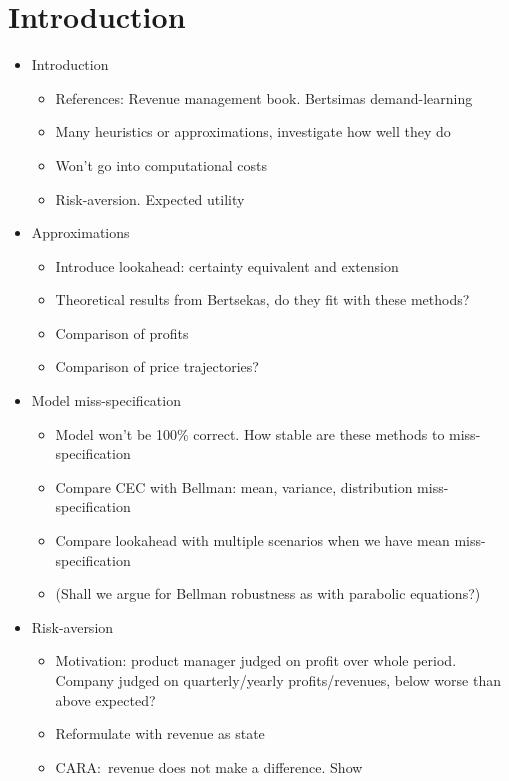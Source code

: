 \documentclass[main.tex]{subfiles}
\begin{document}
\listoftodos

\section{Introduction}

\begin{itemize}
\item Introduction
  \begin{itemize}
  \item References: Revenue management book. Bertsimas demand-learning
  \item Many heuristics or approximations, investigate how well they
    do
  \item Won't go into computational costs
  \item Risk-aversion. Expected utility
  \end{itemize}
\item Approximations
  \begin{itemize}
    \item Introduce lookahead: certainty equivalent and extension
  \item Theoretical results from Bertsekas, do they fit with these methods?
  \item Comparison of profits
  \item Comparison of price trajectories?
  \end{itemize}
\item Model miss-specification
  \begin{itemize}
  \item Model won't be 100\% correct. How stable are these methods to miss-specification
  \item Compare CEC with Bellman: mean, variance, distribution
    miss-specification
  \item Compare lookahead with multiple scenarios when we have mean miss-specification
  \item (Shall we argue for Bellman robustness as with parabolic equations?)
  \end{itemize}
\item Risk-aversion
  \begin{itemize}
  \item Motivation: product manager judged on profit over whole
    period. Company judged on quarterly/yearly profits/revenues, below worse
    than above expected?
  \item Reformulate with revenue as state
  \item CARA:~revenue does not make a difference. Show

\end{itemize}
\end{itemize}
\end{document}
